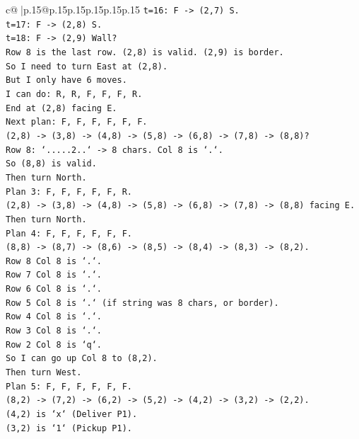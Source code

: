 \documentclass{article}
\begin{document}
{\begin{supertabular}{c@{$\;$}|p{.15\linewidth}@{}p{.15\linewidth}p{.15\linewidth}p{.15\linewidth}p{.15\linewidth}p{.15\linewidth}}
{{{\texttt{t=16: F {-}> (2,7) S.} \\
\texttt{t=17: F {-}> (2,8) S.} \\
\texttt{t=18: F {-}> (2,9) Wall?} \\
\texttt{Row 8 is the last row. (2,8) is valid. (2,9) is border.} \\
\texttt{So I need to turn East at (2,8).} \\
\texttt{But I only have 6 moves.} \\
\texttt{I can do: R, R, F, F, F, R.} \\
\texttt{End at (2,8) facing E.} \\
\texttt{Next plan: F, F, F, F, F, F.} \\
\texttt{(2,8) {-}> (3,8) {-}> (4,8) {-}> (5,8) {-}> (6,8) {-}> (7,8) {-}> (8,8)?} \\
\texttt{Row 8: `.....2..` {-}> 8 chars. Col 8 is `.`.} \\
\texttt{So (8,8) is valid.} \\
\texttt{Then turn North.} \\
\texttt{Plan 3: F, F, F, F, F, R.} \\
\texttt{(2,8) {-}> (3,8) {-}> (4,8) {-}> (5,8) {-}> (6,8) {-}> (7,8) {-}> (8,8) facing E.} \\
\texttt{Then turn North.} \\
\texttt{Plan 4: F, F, F, F, F, F.} \\
\texttt{(8,8) {-}> (8,7) {-}> (8,6) {-}> (8,5) {-}> (8,4) {-}> (8,3) {-}> (8,2).} \\
\texttt{Row 8 Col 8 is `.`.} \\
\texttt{Row 7 Col 8 is `.`.} \\
\texttt{Row 6 Col 8 is `.`.} \\
\texttt{Row 5 Col 8 is `.` (if string was 8 chars, or border).} \\
\texttt{Row 4 Col 8 is `.`.} \\
\texttt{Row 3 Col 8 is `.`.} \\
\texttt{Row 2 Col 8 is `q`.} \\
\texttt{So I can go up Col 8 to (8,2).} \\
\texttt{Then turn West.} \\
\texttt{Plan 5: F, F, F, F, F, F.} \\
\texttt{(8,2) {-}> (7,2) {-}> (6,2) {-}> (5,2) {-}> (4,2) {-}> (3,2) {-}> (2,2).} \\
\texttt{(4,2) is `x` (Deliver P1).} \\
\texttt{(3,2) is `1` (Pickup P1).} \\
}}}
\end{supertabular}}
\end{document}
